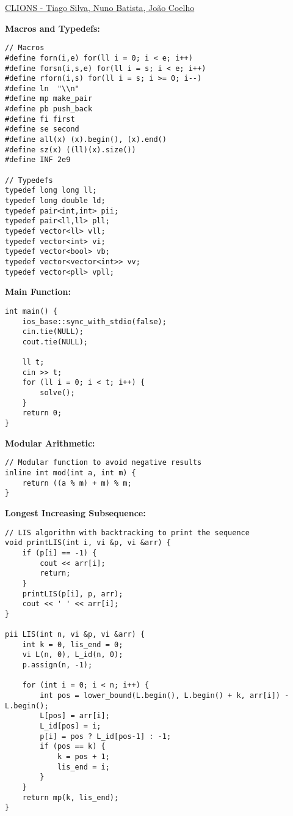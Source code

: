 \documentclass{article}
\begin{document}
\raggedright
\footnotesize

\begin{center}
     \large{\underline{CLIONS - Tiago Silva, Nuno Batista, João Coelho}} \\
\end{center}


\large
\huge\textbf{Macros and Typedefs:}
\large
\begin{lstlisting}
// Macros
#define forn(i,e) for(ll i = 0; i < e; i++)
#define forsn(i,s,e) for(ll i = s; i < e; i++)
#define rforn(i,s) for(ll i = s; i >= 0; i--)
#define ln  "\\n"
#define mp make_pair
#define pb push_back
#define fi first
#define se second
#define all(x) (x).begin(), (x).end()
#define sz(x) ((ll)(x).size())
#define INF 2e9

// Typedefs
typedef long long ll;
typedef long double ld;
typedef pair<int,int> pii;
typedef pair<ll,ll> pll;
typedef vector<ll> vll;
typedef vector<int> vi;
typedef vector<bool> vb;
typedef vector<vector<int>> vv;
typedef vector<pll> vpll;
\end{lstlisting}

\large
\huge\textbf{Main Function:}
\large
\begin{lstlisting}
int main() {
    ios_base::sync_with_stdio(false);
    cin.tie(NULL); 
    cout.tie(NULL);

    ll t;
    cin >> t;
    for (ll i = 0; i < t; i++) {
        solve();
    }
    return 0;
}
\end{lstlisting}

\large
\huge\textbf{Modular Arithmetic:}
\large
\begin{lstlisting}
// Modular function to avoid negative results
inline int mod(int a, int m) {
    return ((a % m) + m) % m;
}
\end{lstlisting}

\large
\huge\textbf{Longest Increasing Subsequence:}
\large
\begin{lstlisting}
// LIS algorithm with backtracking to print the sequence
void printLIS(int i, vi &p, vi &arr) {
    if (p[i] == -1) {
        cout << arr[i];
        return;
    }
    printLIS(p[i], p, arr);
    cout << ' ' << arr[i];
}

pii LIS(int n, vi &p, vi &arr) {
    int k = 0, lis_end = 0;
    vi L(n, 0), L_id(n, 0);
    p.assign(n, -1);

    for (int i = 0; i < n; i++) {
        int pos = lower_bound(L.begin(), L.begin() + k, arr[i]) - L.begin();
        L[pos] = arr[i];
        L_id[pos] = i;
        p[i] = pos ? L_id[pos-1] : -1;
        if (pos == k) {
            k = pos + 1;
            lis_end = i;
        }
    }
    return mp(k, lis_end);
}
\end{lstlisting}
\end{document}
